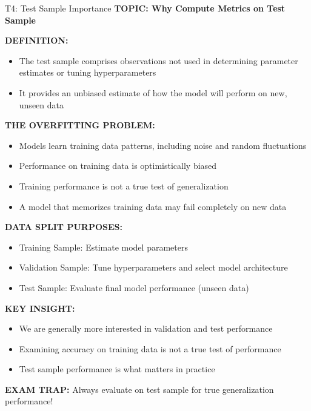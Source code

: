 \documentclass[8pt]{beamer}
\begin{document}
	\begin{frame}{T4: Test Sample Importance}
		\fontsize{6.5}{7.5}\selectfont
		\textbf{TOPIC: Why Compute Metrics on Test Sample}
		
		\vspace{0.1cm}
		\textbf{DEFINITION:}
		\begin{itemize}
			\item The test sample comprises observations not used in determining parameter estimates or tuning hyperparameters
			\item It provides an unbiased estimate of how the model will perform on new, unseen data
		\end{itemize}
		
		\vspace{0.1cm}
		\textbf{THE OVERFITTING PROBLEM:}
		\begin{itemize}
			\item Models learn training data patterns, including noise and random fluctuations
			\item Performance on training data is optimistically biased
			\item Training performance is not a true test of generalization
			\item A model that memorizes training data may fail completely on new data
		\end{itemize}
		
		\vspace{0.1cm}
		\textbf{DATA SPLIT PURPOSES:}
		\begin{itemize}
			\item \textcolor{myblue}{Training Sample:} Estimate model parameters
			\item \textcolor{myblue}{Validation Sample:} Tune hyperparameters and select model architecture
			\item \textcolor{myblue}{Test Sample:} Evaluate final model performance (unseen data)
		\end{itemize}
		
		\vspace{0.1cm}
		\textbf{KEY INSIGHT:}
		\begin{itemize}
			\item We are generally more interested in validation and test performance
			\item Examining accuracy on training data is not a true test of performance
			\item Test sample performance is what matters in practice
		\end{itemize}
		
		\textcolor{myred}{\textbf{EXAM TRAP:}} Always evaluate on \textcolor{myblue}{test sample} for true generalization performance!
	\end{frame}
	
\end{document}
